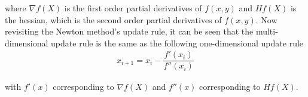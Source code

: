 \documentclass[book.tex]{subfiles}
\begin{document}
where $ \nabla f(X)$ is the first order partial derivatives of $f(x,y)$ and $Hf(X)$ is the hessian, which is the second order partial derivatives of $f(x,y)$. Now revisiting the Newton method's update rule, it can be seen that the multi-dimensional update rule is the same as the following one-dimensional update rule
\begin{align}
x_{i+1} = x_i - \dfrac{f'(x_i)}{f''(x_i)} 
\end{align}
 	
with $f'(x)$ corresponding to $\nabla f(X)$ and $f''(x)$ corresponding to  $Hf(X)$.
	




\end{document}
